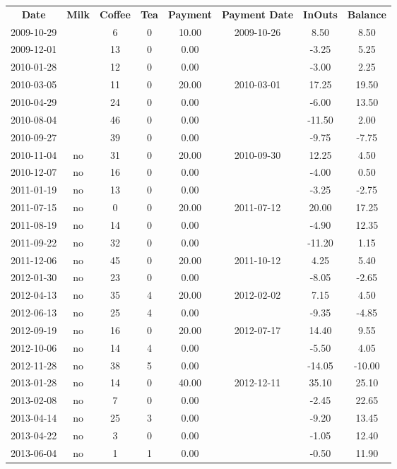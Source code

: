 \begin{center}
\begin{tabular}{cccccccc}
\textbf{Date} & \textbf{Milk} & \textbf{Coffee} & \textbf{Tea} & \textbf{Payment} & \textbf{Payment Date} & \textbf{InOuts} & \textbf{Balance} \\
2009-10-29 &  &  6 & 0 & 10.00 & 2009-10-26 &   8.50 &   8.50\\ 
2009-12-01 &  & 13 & 0 &  0.00 &  &  -3.25 &   5.25\\ 
2010-01-28 &  & 12 & 0 &  0.00 &  &  -3.00 &   2.25\\ 
2010-03-05 &  & 11 & 0 & 20.00 & 2010-03-01 &  17.25 &  19.50\\ 
2010-04-29 &  & 24 & 0 &  0.00 &  &  -6.00 &  13.50\\ 
2010-08-04 &  & 46 & 0 &  0.00 &  & -11.50 &   2.00\\ 
2010-09-27 &  & 39 & 0 &  0.00 &  &  -9.75 &  -7.75\\ 
2010-11-04 & no & 31 & 0 & 20.00 & 2010-09-30 &  12.25 &   4.50\\ 
2010-12-07 & no & 16 & 0 &  0.00 &  &  -4.00 &   0.50\\ 
2011-01-19 & no & 13 & 0 &  0.00 &  &  -3.25 &  -2.75\\ 
2011-07-15 & no &  0 & 0 & 20.00 & 2011-07-12 &  20.00 &  17.25\\ 
2011-08-19 & no & 14 & 0 &  0.00 &  &  -4.90 &  12.35\\ 
2011-09-22 & no & 32 & 0 &  0.00 &  & -11.20 &   1.15\\ 
2011-12-06 & no & 45 & 0 & 20.00 & 2011-10-12 &   4.25 &   5.40\\ 
2012-01-30 & no & 23 & 0 &  0.00 &  &  -8.05 &  -2.65\\ 
2012-04-13 & no & 35 & 4 & 20.00 & 2012-02-02 &   7.15 &   4.50\\ 
2012-06-13 & no & 25 & 4 &  0.00 &  &  -9.35 &  -4.85\\ 
2012-09-19 & no & 16 & 0 & 20.00 & 2012-07-17 &  14.40 &   9.55\\ 
2012-10-06 & no & 14 & 4 &  0.00 &  &  -5.50 &   4.05\\ 
2012-11-28 & no & 38 & 5 &  0.00 &  & -14.05 & -10.00\\ 
2013-01-28 & no & 14 & 0 & 40.00 & 2012-12-11 &  35.10 &  25.10\\ 
2013-02-08 & no &  7 & 0 &  0.00 &  &  -2.45 &  22.65\\ 
2013-04-14 & no & 25 & 3 &  0.00 &  &  -9.20 &  13.45\\ 
2013-04-22 & no &  3 & 0 &  0.00 &  &  -1.05 &  12.40\\ 
2013-06-04 & no &  1 & 1 &  0.00 &  &  -0.50 &  11.90
\end{tabular}
\end{center}

